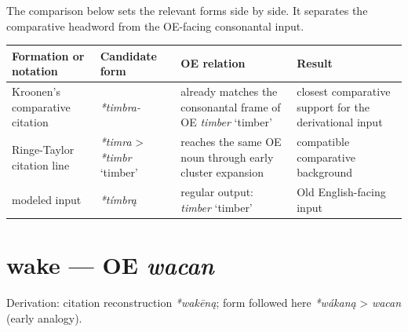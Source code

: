 \documentclass[
  british,
  a4paper,
  openany]{book}
\newcounter{none} %
\providecommand{\Recon}[1]{\emph{*#1}}
{\catcode`→=\active \global\def→{\ensuremath{\rightarrow}}}
\providecommand{\texorpdfstring}[2]{#1}
\providecommand{\Recon}[1]{\emph{*#1}}
{\catcode`→=\active \global\def→{\ensuremath{\rightarrow}}}
\begin{document}
The comparison below sets the relevant forms side by side. It separates
the comparative headword from the OE-facing consonantal input.

{\def\LTcaptype{none} %
\begin{longtable}[]{@{}
  >{\raggedright\arraybackslash}p{}
  >{\raggedright\arraybackslash}p{}
  >{\raggedright\arraybackslash}p{}
  >{\raggedright\arraybackslash}p{}@{}}
\toprule\noalign{}
\begin{minipage}[b]{\linewidth}\raggedright
Formation or notation
\end{minipage} & \begin{minipage}[b]{\linewidth}\raggedright
Candidate form
\end{minipage} & \begin{minipage}[b]{\linewidth}\raggedright
OE relation
\end{minipage} & \begin{minipage}[b]{\linewidth}\raggedright
Result
\end{minipage} \\
\midrule\noalign{}
\endhead
\bottomrule\noalign{}
\endlastfoot
Kroonen's comparative citation & {\emph{*timbra-}} & already matches the
consonantal frame of OE {\emph{timber}} `timber' & closest comparative
support for the derivational input \\
Ringe-Taylor citation line & {\emph{*timra}} \textgreater{}
{\Recon{timbr} `timber'} & reaches the same OE noun through early
cluster expansion & compatible comparative background \\
modeled input & {\emph{*tímbrą}} & regular output: {\emph{timber}}
`timber' & Old English-facing input \\
\end{longtable}
}

\section{\texorpdfstring{wake --- OE
\emph{wacan}}{wake --- OE wacan}}\label{wake-oe-wacan}


Derivation: citation reconstruction \emph{*wakēną}; form followed here
\emph{*wákaną} \textgreater{} \emph{wacan} (early analogy).
\end{document}
